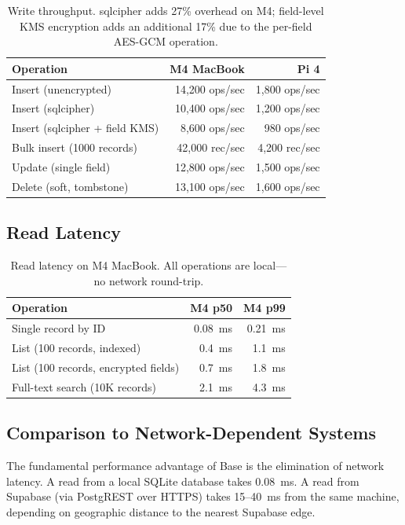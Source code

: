 \documentclass[11pt]{article}
\begin{document}
\begin{table}[H]
\centering
\small
\begin{tabular}{lrr}
\toprule
\textbf{Operation} & \textbf{M4 MacBook} & \textbf{Pi 4} \\
\midrule
Insert (unencrypted) & 14,200 ops/sec & 1,800 ops/sec \\
Insert (sqlcipher) & 10,400 ops/sec & 1,200 ops/sec \\
Insert (sqlcipher + field KMS) & 8,600 ops/sec & 980 ops/sec \\
Bulk insert (1000 records) & 42,000 rec/sec & 4,200 rec/sec \\
Update (single field) & 12,800 ops/sec & 1,500 ops/sec \\
Delete (soft, tombstone) & 13,100 ops/sec & 1,600 ops/sec \\
\bottomrule
\end{tabular}
\caption{Write throughput. sqlcipher adds 27\% overhead on M4; field-level KMS
encryption adds an additional 17\% due to the per-field AES-GCM operation.}
\label{tab:writes}
\end{table}

\subsection{Read Latency}

\begin{table}[H]
\centering
\small
\begin{tabular}{lrr}
\toprule
\textbf{Operation} & \textbf{M4 p50} & \textbf{M4 p99} \\
\midrule
Single record by ID & 0.08~ms & 0.21~ms \\
List (100 records, indexed) & 0.4~ms & 1.1~ms \\
List (100 records, encrypted fields) & 0.7~ms & 1.8~ms \\
Full-text search (10K records) & 2.1~ms & 4.3~ms \\
\bottomrule
\end{tabular}
\caption{Read latency on M4 MacBook. All operations are local---no network
round-trip.}
\label{tab:reads}
\end{table}

\subsection{Comparison to Network-Dependent Systems}

The fundamental performance advantage of Base is the elimination of network
latency. A read from a local SQLite database takes 0.08~ms. A read from
Supabase (via PostgREST over HTTPS) takes 15--40~ms from the same machine,
depending on geographic distance to the nearest Supabase edge.
\end{document}
